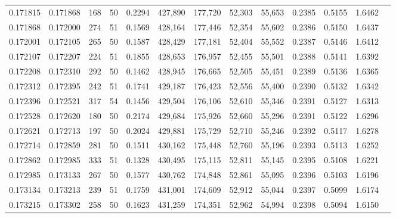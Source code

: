 \begin{tabular}{rrrrrrrrrrrrr}
0.171815 & 0.171868 &   168 &  50 &                                     0.2294 & 427,890 & 177,720 &  52,303 &  55,653 & 0.2385 & 0.5155 & 1.6462 \\
0.171868 & 0.172000 &   274 &  51 &                                     0.1569 & 428,164 & 177,446 &  52,354 &  55,602 & 0.2386 & 0.5150 & 1.6437 \\
0.172001 & 0.172105 &   265 &  50 &                                     0.1587 & 428,429 & 177,181 &  52,404 &  55,552 & 0.2387 & 0.5146 & 1.6412 \\
0.172107 & 0.172207 &   224 &  51 &                                     0.1855 & 428,653 & 176,957 &  52,455 &  55,501 & 0.2388 & 0.5141 & 1.6392 \\
0.172208 & 0.172310 &   292 &  50 &                                     0.1462 & 428,945 & 176,665 &  52,505 &  55,451 & 0.2389 & 0.5136 & 1.6365 \\
0.172312 & 0.172395 &   242 &  51 &                                     0.1741 & 429,187 & 176,423 &  52,556 &  55,400 & 0.2390 & 0.5132 & 1.6342 \\
0.172396 & 0.172521 &   317 &  54 &                                     0.1456 & 429,504 & 176,106 &  52,610 &  55,346 & 0.2391 & 0.5127 & 1.6313 \\
0.172528 & 0.172620 &   180 &  50 &                                     0.2174 & 429,684 & 175,926 &  52,660 &  55,296 & 0.2391 & 0.5122 & 1.6296 \\
0.172621 & 0.172713 &   197 &  50 &                                     0.2024 & 429,881 & 175,729 &  52,710 &  55,246 & 0.2392 & 0.5117 & 1.6278 \\
0.172714 & 0.172859 &   281 &  50 &                                     0.1511 & 430,162 & 175,448 &  52,760 &  55,196 & 0.2393 & 0.5113 & 1.6252 \\
0.172862 & 0.172985 &   333 &  51 &                                     0.1328 & 430,495 & 175,115 &  52,811 &  55,145 & 0.2395 & 0.5108 & 1.6221 \\
0.172985 & 0.173133 &   267 &  50 &                                     0.1577 & 430,762 & 174,848 &  52,861 &  55,095 & 0.2396 & 0.5103 & 1.6196 \\
0.173134 & 0.173213 &   239 &  51 &                                     0.1759 & 431,001 & 174,609 &  52,912 &  55,044 & 0.2397 & 0.5099 & 1.6174 \\
0.173215 & 0.173302 &   258 &  50 &                                     0.1623 & 431,259 & 174,351 &  52,962 &  54,994 & 0.2398 & 0.5094 & 1.6150 \\

\end{tabular}
